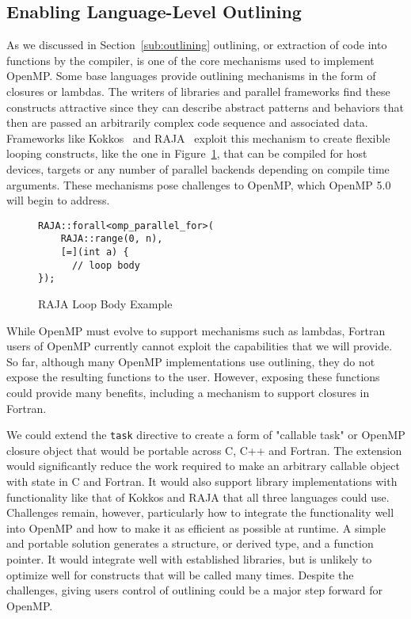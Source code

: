 \subsection{Enabling Language-Level Outlining}
\label{sub:enabling_language_level_outlining}

As we discussed in Section~\ref{sub:outlining} outlining, or extraction 
of code into functions by the compiler, is one of the core mechanisms 
used to implement OpenMP. Some base languages provide outlining mechanisms 
in the form of closures or lambdas. The writers of libraries and parallel 
frameworks find these constructs attractive since they can describe abstract 
patterns and behaviors that then are passed an arbitrarily complex code 
sequence and associated data. Frameworks like Kokkos~\cite{kokkos} and 
RAJA~\cite{raja} exploit this mechanism to create flexible looping constructs, 
like the one in Figure~\ref{fig:raja}, that can be compiled for host devices, 
targets or any number of parallel backends depending on compile time arguments.
These mechanisms pose challenges to OpenMP, which OpenMP 5.0 will begin to
address.

\begin{figure}
\begin{verbatim}
RAJA::forall<omp_parallel_for>(
    RAJA::range(0, n),
    [=](int a) {
      // loop body
});
\end{verbatim}
\caption{RAJA Loop Body Example\label{fig:raja}}
\end{figure}

While OpenMP must evolve to support mechanisms such as lambdas, Fortran
users of OpenMP currently cannot exploit the capabilities that we will 
provide. So far, although many OpenMP implementations use outlining, they 
do not expose the resulting functions to the user. However, exposing these 
functions could provide many benefits, including a mechanism to support
closures in Fortran.
 
We could extend the \texttt{task} directive to create a form 
of "callable task" or OpenMP closure object that would be portable across 
C, C++ and Fortran. The extension would significantly reduce the work 
required to make an arbitrary callable object with state in C and Fortran.
It would also support library implementations with functionality like that 
of Kokkos and RAJA that all three languages could use. Challenges remain,
however, particularly how to integrate the functionality well into OpenMP 
and how to make it as efficient as possible at runtime. A simple and 
portable solution generates a structure, or derived type, and a function 
pointer. It would integrate well with established libraries, but is unlikely 
to optimize well for constructs that will be called many times. Despite 
the challenges, giving users control of outlining could be
a major step forward for OpenMP.


